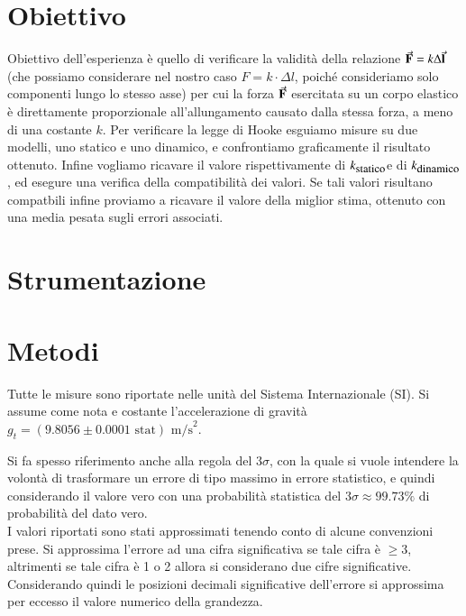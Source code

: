 \documentclass[italian, a4paper, 10pt, twocolumn]{../../style/lab_unige}
\newcommand{\gLab}{$g_t=(9.8056\pm0.0001 \text{ stat}) \text{ m/s}^2$\space}
\newcommand{\ks}{$k_{\text{\small statico}}$\space}
\newcommand{\kd}{$k_{\text{\small dinamico}}$\space}
\newcommand{\treSigma}{$3\sigma$\space}
\newcommand{\hookeLaw}{$F=k\cdot\Delta l$\space}
\begin{document}
    \section{Obiettivo}
    \label{section:aim}
    Obiettivo dell'esperienza è quello di verificare la validità della relazione $\va{F}=k\Delta\va{l}$ (che 
    possiamo considerare nel nostro caso \hookeLaw , poiché consideriamo solo componenti lungo lo stesso asse) 
    per cui la forza $\va{F}$ esercitata su un corpo elastico è direttamente proporzionale all'allungamento 
    causato dalla stessa forza, a meno di una costante $k$.
    Per verificare la legge di Hooke esguiamo misure su due modelli, uno statico e uno dinamico, e confrontiamo 
    graficamente il risultato ottenuto. Infine vogliamo ricavare il valore rispettivamente di \ks e di \kd, ed
    esegure una verifica della compatibilità dei valori. Se tali valori risultano compatbili infine proviamo a 
    ricavare il valore della miglior stima, ottenuto con una media pesata sugli errori associati.

    \section{Strumentazione}
    \label{section:strument}

    \section{Metodi}
    \label{section:methods}
    Tutte le misure sono riportate nelle unità del Sistema Internazionale (SI). Si assume come nota e costante 
    l'accelerazione di gravità \gLab .

    
    Si fa spesso riferimento anche alla regola del \treSigma, con la quale si vuole intendere la volontà di 
    trasformare un errore di tipo massimo in errore statistico, e quindi considerando il valore vero con una
    probabilità statistica del \treSigma $\approx99.73\%$ di probabilità del dato vero.\\
    I valori riportati sono stati approssimati tenendo conto di alcune convenzioni prese. Si approssima 
    l'errore ad una cifra significativa se tale cifra è $\geqslant3$, altrimenti se tale cifra è 1 o 2 allora
    si considerano due cifre significative. Considerando quindi le posizioni decimali significative dell'errore
    si approssima per eccesso il valore numerico della grandezza. 
\end{document}
